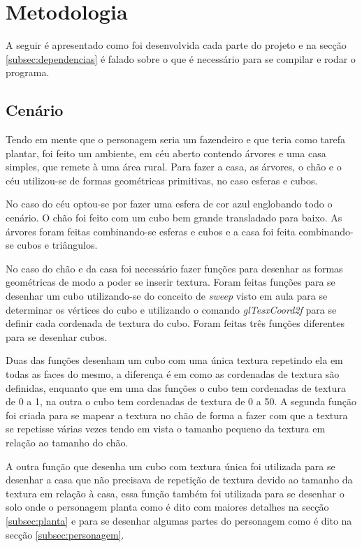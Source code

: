 \documentclass[
	12pt,				%
	openright,			%
	a4paper,			%
	english,			%
	french,				%
	spanish,			%
	brazil,				%
	]{abntex2}
\begin{document}
\chapter{Metodologia}

	A seguir é apresentado como foi desenvolvida cada parte do projeto e na secção \ref{subsec:dependencias} é falado sobre o que é necessário para se compilar e rodar o programa.

 \section{Cenário}
	
	Tendo em mente que o personagem seria um fazendeiro e que teria como tarefa plantar, foi feito um ambiente, em céu aberto contendo árvores e uma casa simples, que remete à uma área rural. Para fazer a casa, as árvores, o chão e o céu utilizou-se de formas geométricas primitivas, no caso esferas e cubos.

	No caso do céu optou-se por fazer uma esfera de cor azul englobando todo o cenário. O chão foi feito com um cubo  bem grande transladado para baixo. As árvores foram feitas combinando-se esferas e cubos e a casa foi feita combinando-se cubos e triângulos.

No caso do chão e da casa foi necessário fazer funções para desenhar as formas geométricas de modo a poder se inserir textura. Foram feitas funções para se desenhar um cubo utilizando-se do conceito de \emph{sweep} visto em aula para se determinar os vértices do cubo e utilizando o comando \emph {glTesxCoord2f } para se definir cada cordenada de textura do cubo. Foram feitas três funções diferentes para se desenhar cubos.

Duas das funções desenham um cubo com uma única textura repetindo ela em todas as faces do mesmo, a diferença é em como as cordenadas de textura são definidas, enquanto que em uma das funções o cubo tem cordenadas de textura de 0 a 1, na outra o cubo tem cordenadas de textura de 0 a 50. A segunda função foi criada para se mapear a textura no chão de forma a fazer com que a textura se repetisse várias vezes tendo em vista o tamanho pequeno da textura em relação ao tamanho do chão.

A outra função que desenha um cubo com textura única foi utilizada para se desenhar a casa que não precisava de repetição de textura devido ao tamanho da textura em relação à casa, essa função também foi utilizada para se desenhar o solo onde o personagem planta como é dito com maiores detalhes na secção \ref{subsec:planta}  e para se desenhar algumas partes do personagem como é dito na secção  \ref{subsec:personagem}. 
\end{document}
